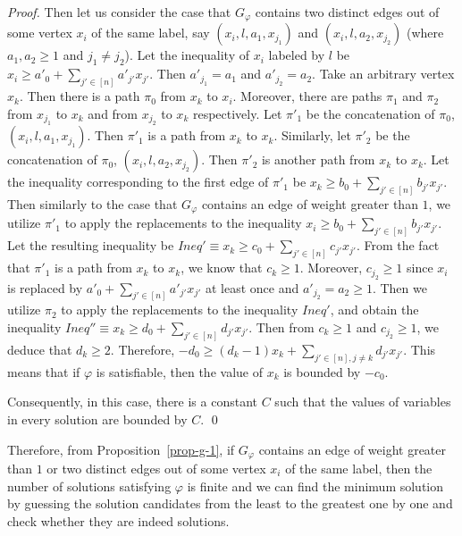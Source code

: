 \documentclass[runningheads]{llncs}
\begin{document}
\begin{proof}
Then let us consider the case that $G_\varphi$ contains two distinct edges out of some vertex $x_i$ of the same label, say $(x_i, l, a_1, x_{j_1})$ and $(x_i, l, a_2, x_{j_2})$ (where $a_1, a_2 \ge 1$ and $j_1 \neq j_2$). Let the inequality of $x_i$ labeled by $l$ be $x_i \ge a'_0 + \sum \limits_{j' \in [n]} a'_{j'} x_{j'}$. Then $a'_{j_1} = a_1$ and $a'_{j_2} = a_2$. 
Take an arbitrary vertex $x_k$. Then there is a path $\pi_0$ from $x_k$ to $x_i$. Moreover, there are paths $\pi_1$ and $\pi_2$ from $x_{j_1}$ to $x_k$ and from $x_{j_2}$ to $x_k$ respectively. Let $\pi'_1$ be the concatenation of $\pi_0$, $(x_i, l, a_1, x_{j_1})$. Then $\pi'_1$ is a path from $x_k$ to $x_k$. Similarly, let $\pi'_2$ be the concatenation of $\pi_0$, $(x_i, l, a_2, x_{j_2})$. Then $\pi'_2$ is another path from $x_k$ to $x_k$. 
Let the inequality corresponding to the first edge of $\pi'_1$ be $x_k \ge b_0 + \sum \limits_{j' \in [n]} b_{j'} x_{j'}$. Then similarly to the case that $G_\varphi$ contains an edge of weight greater than $1$, we utilize $\pi'_1$ to apply the replacements to the inequality $x_i \ge b_0 + \sum \limits_{j' \in [n]} b_{j'} x_{j'}$. Let the resulting inequality be $Ineq' \equiv x_k \ge c_0 + \sum \limits_{j' \in [n]} c_{j'} x_{j'}$. From the fact that $\pi'_1$ is a path from $x_k$ to $x_k$, we know that $c_k \ge 1$. Moreover, 
$c_{j_2} \ge 1$ since $x_i$ is replaced by $a'_0 + \sum \limits_{j' \in [n]} a'_{j'} x_{j'}$ at least once and $a'_{j_2} = a_2 \ge 1$. Then we utilize $\pi_2$ to apply the replacements to the inequality $Ineq'$, and obtain the inequality $Ineq'' \equiv x_k \ge d_0 + \sum \limits_{j' \in [n]} d_{j'} x_{j'}$. Then from $c_k \ge 1$ and $c_{j_2} \ge 1$, we deduce that $d_k \ge 2$. Therefore, $-d_0 \ge (d_k - 1) x_k + \sum \limits_{j' \in [n], j \neq k} d_{j'} x_{j'}$. This means that if $\varphi$ is satisfiable, then the value of $x_k$ is bounded by $-c_0$.

Consequently, in this case,  there is a constant $C$ such that the values of variables in every solution are bounded by $C$.
\qed
\end{proof}

Therefore, from Proposition~\ref{prop-g-1}, if $G_\varphi$ contains an edge of weight greater than $1$ or two distinct edges out of some vertex $x_i$ of the same label, then the number of solutions satisfying $\varphi$ is finite and we can find the minimum solution by guessing the solution candidates from the least to the greatest one by one and check whether they are indeed solutions. 
\end{document}
